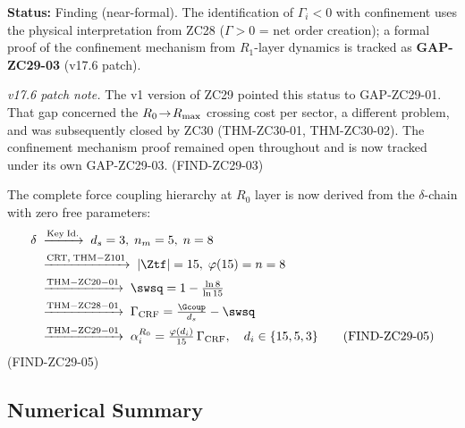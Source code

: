 \documentclass[12pt, a4paper]{article}
\begin{document}
\begin{derivedbox}[title={FIND-ZC29-03: Confinement Asymmetry
  --- Gamma$_i < 0$ for Confined Sectors}]
\medskip
\textbf{Status:} Finding (near-formal).
The identification of $\Gamma_i < 0$ with confinement uses the
physical interpretation from ZC28 ($\Gamma > 0$ = net order creation);
a formal proof of the confinement mechanism from $R_1$-layer
dynamics is tracked as \textbf{GAP-ZC29-03} (v17.6 patch).

\medskip
\textit{v17.6 patch note.} The v1 version of ZC29 pointed this
status to GAP-ZC29-01. That gap concerned the
$R_0\!\to\!R_{\rm max}$ crossing cost per sector, a different
problem, and was subsequently closed by ZC30 (THM-ZC30-01,
THM-ZC30-02). The confinement mechanism proof remained open
throughout and is now tracked under its own GAP-ZC29-03.
\hfill\textup{(FIND-ZC29-03)}
\end{derivedbox}

\begin{derivedbox}[title={FIND-ZC29-05: Full Force Hierarchy
  from $\delta$-Chain}]
\label{zc29:find:full}
The complete force coupling hierarchy at $R_0$ layer is now
derived from the $\delta$-chain with zero free parameters:
\begin{align}
  \delta
  &\;\xrightarrow{\rm Key\;Id.}\;
  d_s=3,\;n_m=5,\;n=8
  \notag\\
  &\;\xrightarrow{\rm CRT,\;THM-Z101}\;
  |\Ztf|=15,\;\varphi(15)=n=8
  \notag\\
  &\;\xrightarrow{\rm THM-ZC20-01}\;
  \swsq = 1 - \tfrac{\ln 8}{\ln 15}
  \notag\\
  &\;\xrightarrow{\rm THM-ZC28-01}\;
  \Gamma_{\rm CRF}
  = \tfrac{\Gcoup}{d_s} - \swsq
  \notag\\
  &\;\xrightarrow{\rm THM-ZC29-01}\;
  \alpha_i^{R_0}
  = \tfrac{\varphi(d_i)}{15}\,\Gamma_{\rm CRF},
  \quad d_i \in \{15,5,3\}
  \tag{FIND-ZC29-05}
\end{align}
\hfill\textup{(FIND-ZC29-05)}
\end{derivedbox}

\subsection{Numerical Summary}
\label{zc29:sec:numerical}
\end{document}
